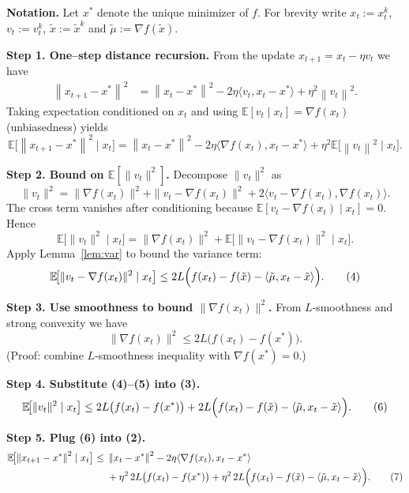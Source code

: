 \documentclass{article}
\newcommand{\E}{\mathbb{E}}
\newcommand{\norm}[1]{\left\|#1\right\|}
\newcommand{\inner}[2]{\langle #1,#2\rangle}
\begin{document}
\bigskip
\noindent\textbf{Notation.} Let $x^{*}$ denote the unique minimizer of $f$.  For brevity write $x_t:=x_t^{k}$, $v_t:=v_t^{k}$, $\tilde{x}:=\tilde{x}^{k}$ and $\tilde{\mu}:=\nabla f(\tilde{x})$.

\bigskip
\noindent\textbf{Step 1. One–step distance recursion.}  
From the update $x_{t+1}=x_t-\eta v_t$ we have
\[
\begin{aligned}
\norm{x_{t+1}-x^{*}}^{2}
&=\norm{x_t-x^{*}}^{2}-2\eta\inner{v_t}{x_t-x^{*}}+\eta^{2}\norm{v_t}^{2}. \tag{1}
\end{aligned}
\]
Taking expectation conditioned on $x_t$ and using $\E[v_t\mid x_t]=\nabla f(x_t)$ (unbiasedness) yields
\[
\E\!\bigl[\norm{x_{t+1}-x^{*}}^{2}\mid x_t\bigr]
= \norm{x_t-x^{*}}^{2}
-2\eta\inner{\nabla f(x_t)}{x_t-x^{*}}
+\eta^{2}\E\!\bigl[\norm{v_t}^{2}\mid x_t\bigr]. \tag{2}
\]

\bigskip
\noindent\textbf{Step 2. Bound on $\E[\|v_t\|^{2}]$.}  
Decompose $\|v_t\|^{2}$ as
\[
\|v_t\|^{2}
= \|\nabla f(x_t)\|^{2}
+ \|v_t-\nabla f(x_t)\|^{2}
+2\inner{v_t-\nabla f(x_t)}{\nabla f(x_t)}.
\]
The cross term vanishes after conditioning because $\E[v_t-\nabla f(x_t)\mid x_t]=0$. Hence
\[
\E\!\bigl[\|v_t\|^{2}\mid x_t\bigr]
= \|\nabla f(x_t)\|^{2}
+ \E\!\bigl[\|v_t-\nabla f(x_t)\|^{2}\mid x_t\bigr]. \tag{3}
\]
Apply Lemma~\ref{lem:var} to bound the variance term:
\[
\E\!\bigl[\|v_t-\nabla f(x_t)\|^{2}\mid x_t\bigr]
\le 2L\Bigl(f(x_t)-f(\tilde{x})-\inner{\tilde{\mu}}{x_t-\tilde{x}}\Bigr). \tag{4}
\]

\bigskip
\noindent\textbf{Step 3. Use smoothness to bound $\|\nabla f(x_t)\|^{2}$.}  
From $L$‑smoothness and strong convexity we have
\[
\|\nabla f(x_t)\|^{2}
\le 2L\bigl(f(x_t)-f(x^{*})\bigr). \tag{5}
\]
(Proof: combine $L$‑smoothness inequality with $\nabla f(x^{*})=0$.)

\bigskip
\noindent\textbf{Step 4. Substitute (4)–(5) into (3).}  
\[
\E\!\bigl[\|v_t\|^{2}\mid x_t\bigr]
\le 2L\bigl(f(x_t)-f(x^{*})\bigr)
+2L\Bigl(f(x_t)-f(\tilde{x})-\inner{\tilde{\mu}}{x_t-\tilde{x}}\Bigr). \tag{6}
\]

\bigskip
\noindent\textbf{Step 5. Plug (6) into (2).}  
\[
\begin{aligned}
\E\!\bigl[\norm{x_{t+1}-x^{*}}^{2}\mid x_t\bigr]
\le &\;\norm{x_t-x^{*}}^{2}
-2\eta\inner{\nabla f(x_t)}{x_t-x^{*}}\\
&\;+\eta^{2}\,2L\bigl(f(x_t)-f(x^{*})\bigr)
+\eta^{2}\,2L\Bigl(f(x_t)-f(\tilde{x})-\inner{\tilde{\mu}}{x_t-\tilde{x}}\Bigr). \tag{7}
\end{aligned}
\]
\end{document}
